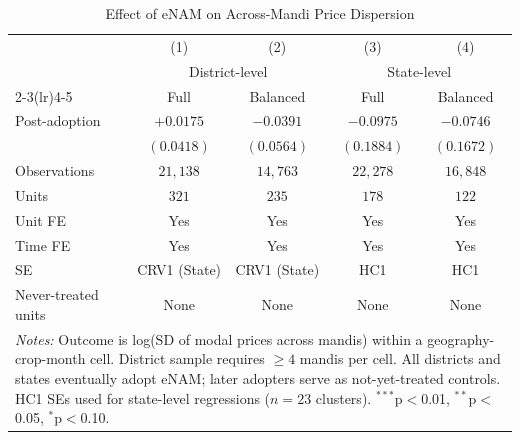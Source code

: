 \begin{table}[htbp]
\centering
\caption{Effect of eNAM on Across-Mandi Price Dispersion}
\label{tab:across_mandi_main}
\begin{tabular}{lcccc}
\hline\hline
 & (1) & (2) & (3) & (4) \\
 & \multicolumn{2}{c}{District-level} & \multicolumn{2}{c}{State-level} \\
\cmidrule(lr){2-3}\cmidrule(lr){4-5}
 & Full & Balanced & Full & Balanced \\
\hline
Post-adoption & $+0.0175$ & $-0.0391$ & $-0.0975$ & $-0.0746$ \\
 & $(0.0418)$ & $(0.0564)$ & $(0.1884)$ & $(0.1672)$ \\
\hline
Observations & $21,138$ & $14,763$ & $22,278$ & $16,848$ \\
Units & $321$ & $235$ & $178$ & $122$ \\
Unit FE & Yes & Yes & Yes & Yes \\
Time FE & Yes & Yes & Yes & Yes \\
SE & CRV1 (State) & CRV1 (State) & HC1 & HC1 \\
Never-treated units & None & None & None & None \\
\hline\hline
\multicolumn{5}{l}{\footnotesize \textit{Notes:} Outcome is log(SD of modal prices across mandis) within a geography-crop-month cell. District sample requires $\geq 4$ mandis per cell. All districts and states eventually adopt eNAM; later adopters serve as not-yet-treated controls. HC1 SEs used for state-level regressions ($n=23$ clusters). $^{{***}}$p$<$0.01, $^{{**}}$p$<$0.05, $^{{*}}$p$<$0.10.}} \\
\end{tabular}
\end{table}